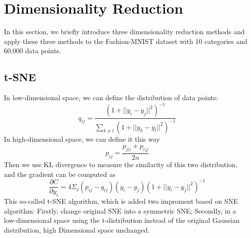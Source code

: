 \documentclass[12pt]{article}
\begin{document}
\section*{Dimensionality Reduction}
In this section, we briefly introduce three dimensionality reduction methods and apply these three methods to the Fashion-MNIST dataset with 10 categories and 60,000 data points. 
\subsection*{t-SNE}
In low-dimensional space, we can define the distribution of data points:
\begin{equation}\label{t-sne low dimensionality}
	q_{ij} = \frac{(1 + ||y_{i}-y_{j}||^2)^{-1}}{\sum_{k\neq l}(1+||y_{k}-y_{l}||^2)^{-1}}
\end{equation}
In high-dimensional space, we can define it this way
\begin{equation}\label{t-sne high dimensionality}
p_{ij} = \frac{p_{j|i}+p_{i|j}}{2n}
\end{equation}
Then we use KL divergence to measure the similarity of this two distribution, and the gradient can be computed as
\begin{equation}\label{t-sne label}
	\frac{\partial C}{\partial y_{i}} = 4 \Sigma_{j}(p_{ij}-q_{ij})(y_{i}-y_{j})(1+||y_{i}-y_{j}||^2)^{-1}
\end{equation}
This so-called t-SNE algorithm, which is added two improment based on SNE algorithm: Firstly, change original SNE into a symmetric SNE; Secondly, in a low-dimensional space using the t-distribution instead of the original Gaussian distribution, high Dimensional space unchanged.
\end{document}
